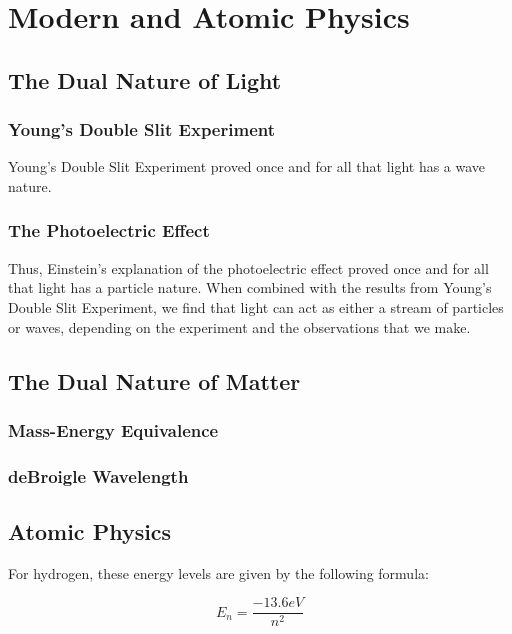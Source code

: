 \chapter{Modern and Atomic Physics}
\label{chap:modern}
\section{The Dual Nature of Light} 
\subsection{Young's Double Slit Experiment} 
Young's Double Slit Experiment proved once and for all that light has a wave nature.  
\subsection{The Photoelectric Effect} 
Thus, Einstein's explanation of the photoelectric effect proved once and for all that light has a particle nature.  When combined with the results from Young's Double Slit Experiment, we find that light can act as either a stream of particles or waves, depending on the experiment and the observations that we make.  


\section{The Dual Nature of Matter} 
\subsection{Mass-Energy Equivalence} 
\subsection{deBroigle Wavelength} 

\section{Atomic Physics} 


For hydrogen, these energy levels are given by the following formula:

\begin{mdframed}[backgroundcolor=orange!20!white]
	\begin{equation}
	E_n = \frac{-13.6 \si{eV}}{n^2}  
	\label{eqn:hydrogenenergy}
	\end{equation}
\end{mdframed}

